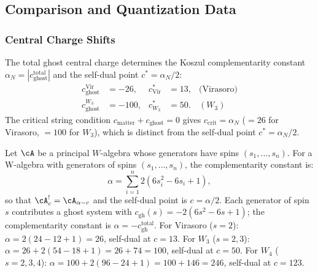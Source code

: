 
\subsection{Comparison and Quantization Data}

\subsubsection{Central Charge Shifts}

The total ghost central charge determines the Koszul complementarity
constant $\alpha_N = |c_{\mathrm{ghost}}^{\mathrm{total}}|$
and the self-dual point $c^* = \alpha_N/2$:
\begin{align}
c_{\mathrm{ghost}}^{\mathrm{Vir}} &= -26, &
 c^*_{\mathrm{Vir}} &= 13, & \text{(Virasoro)}\\
c_{\mathrm{ghost}}^{W_3} &= -100, &
 c^*_{W_3} &= 50. & (W_3)
\end{align}
The critical string condition $c_{\mathrm{matter}} + c_{\mathrm{ghost}} = 0$
gives $c_{\mathrm{crit}} = \alpha_N$ ($= 26$ for Virasoro, $= 100$ for
$W_3$), which is distinct from the self-dual point $c^* = \alpha_N/2$.

\begin{theorem}
Let\/ $\cA$ be a principal $W$-algebra whose generators have spins
$(s_1,\ldots,s_n)$.
For a W-algebra with generators of spins $(s_1, \ldots, s_n)$, the complementarity constant is:
\begin{equation}
\alpha = \sum_{i=1}^n 2(6s_i^2 - 6s_i + 1),
\end{equation}
so that $\cA_c^! = \cA_{\alpha - c}$ and the self-dual point is $c = \alpha/2$.
Each generator of spin~$s$ contributes a ghost system with $c_{\mathrm{gh}}(s) = -2(6s^2 - 6s + 1)$;
the complementarity constant is $\alpha = -c_{\mathrm{gh}}^{\mathrm{total}}$.
For Virasoro ($s=2$): $\alpha = 2(24 - 12 + 1) = 26$, self-dual at $c = 13$. For $W_3$ ($s=2,3$): $\alpha = 26 + 2(54 - 18 + 1) = 26 + 74 = 100$, self-dual at $c = 50$. For $W_4$ ($s=2,3,4$): $\alpha = 100 + 2(96 - 24 + 1) = 100 + 146 = 246$, self-dual at $c = 123$.
\end{theorem}


